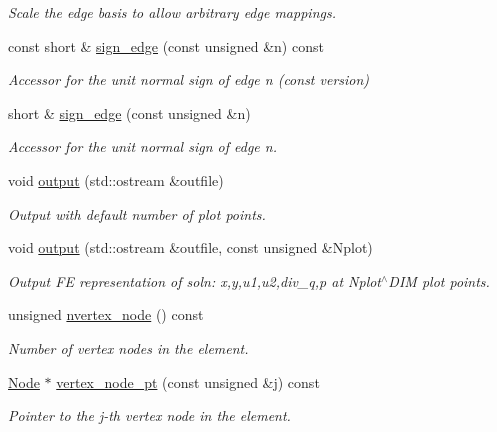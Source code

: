 \begin{DoxyCompactItemize}
\begin{DoxyCompactList}\small\item\em Scale the edge basis to allow arbitrary edge mappings. \end{DoxyCompactList}\item 
const short \& \hyperlink{classoomph_1_1TRaviartThomasDarcyElement_a210a7eb47fff529cd80d7203d6c76865}{sign\+\_\+edge} (const unsigned \&n) const
\begin{DoxyCompactList}\small\item\em Accessor for the unit normal sign of edge n (const version) \end{DoxyCompactList}\item 
short \& \hyperlink{classoomph_1_1TRaviartThomasDarcyElement_a5f6c83af4ce8e8eed262eb91ed75a5e1}{sign\+\_\+edge} (const unsigned \&n)
\begin{DoxyCompactList}\small\item\em Accessor for the unit normal sign of edge n. \end{DoxyCompactList}\item 
void \hyperlink{classoomph_1_1TRaviartThomasDarcyElement_a5ef511a62668baf093c5531be1e086d7}{output} (std\+::ostream \&outfile)
\begin{DoxyCompactList}\small\item\em Output with default number of plot points. \end{DoxyCompactList}\item 
void \hyperlink{classoomph_1_1TRaviartThomasDarcyElement_a92836a1620402bebe5c9e62ec5ea2c5a}{output} (std\+::ostream \&outfile, const unsigned \&Nplot)
\begin{DoxyCompactList}\small\item\em Output FE representation of soln\+: x,y,u1,u2,div\+\_\+q,p at Nplot$^\wedge$\+D\+IM plot points. \end{DoxyCompactList}\item 
unsigned \hyperlink{classoomph_1_1TRaviartThomasDarcyElement_a37259bdb01f2dc45d6bf26976e6e1cfd}{nvertex\+\_\+node} () const
\begin{DoxyCompactList}\small\item\em Number of vertex nodes in the element. \end{DoxyCompactList}\item 
\hyperlink{classoomph_1_1Node}{Node} $\ast$ \hyperlink{classoomph_1_1TRaviartThomasDarcyElement_a825931f56d8b570bc515808dee107353}{vertex\+\_\+node\+\_\+pt} (const unsigned \&j) const
\begin{DoxyCompactList}\small\item\em Pointer to the j-\/th vertex node in the element. \end{DoxyCompactList}\item 

\end{DoxyCompactItemize}
